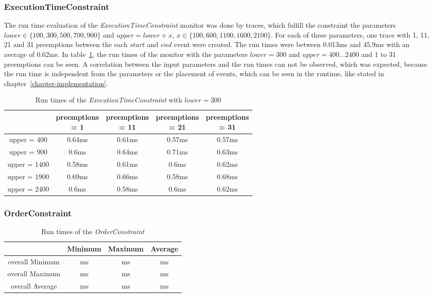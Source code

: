 \subsubsection{ExecutionTimeConstraint}
	The run time evaluation of the \textit{ExecutionTimeConstraint} monitor was done by traces, which fulfill the constraint the parameters $lower\in\{100,300,500,700,900\}$ and $upper=lower+x$, $x\in\{100,600,1100,1600,2100\}$. For each of these parameters, one trace with 1, 11, 21 and 31 preemptions between the each $start$ and $end$ event were created. The run times were between 0.013ms and 45.9ms with an average of 0.62ms. In table~\ref{tab:runtimeExecutionTimeConstraint}, the run times of the monitor with the parameters $lower = 300$ and $upper = 400...2400$ and 1 to 31 preemptions can be seen. A correlation between the input parameters and the run times can not be observed, which was expected, because the run time is independent from the parameters or the placement of events, which can be seen in the runtime, like stated in chapter~\ref{chapter-implementation}.
\begin{table}
	\begin{tabular}{|c|c|c|c|c|}
		\hline
					& \makecell{preemptions\\ = 1} & \makecell{preemptions\\ = 11} & \makecell{preemptions\\ = 21} & \makecell{preemptions\\ = 31}\\
		\hline
		upper = 400	& 	0.64ms		  & 0.61ms			 &	0.57ms			& 0.57ms\\
		\hline
		upper = 900	& 	0.6ms		  & 0.64ms			 &	0.71ms			& 0.63ms\\
		\hline
		upper = 1400& 	0.58ms		  & 0.61ms			 &	0.6ms			& 0.62ms\\
		\hline
		upper = 1900& 	0.69ms		  & 0.66ms			 &	0.58ms			& 0.68ms\\
		\hline
		upper = 2400& 	0.6ms		  & 0.58ms			 &	0.6ms			& 0.62ms\\
		\hline
	\end{tabular}
	\centering
	\caption{Run times of the \textit{ExecutionTimeConstraint} with $lower = 300$}
	\label{tab:runtimeExecutionTimeConstraint}
\end{table}

\subsubsection{OrderConstraint}
\begin{table}
	\begin{tabular}{|c|c|c|c|}
		\hline
		& Minimum &  Maximum &  Average \\
		\hline
		overall Minimum & ms & ms & ms\\
		\hline
		overall Maximum & ms & ms & ms\\
		\hline
		overall Average & ms & ms & ms\\
		\hline
	\end{tabular}
	\centering
	\caption{Run times of the \textit{OrderConstraint}}
	\label{tab:runtimeOrderConstraint}
\end{table}


